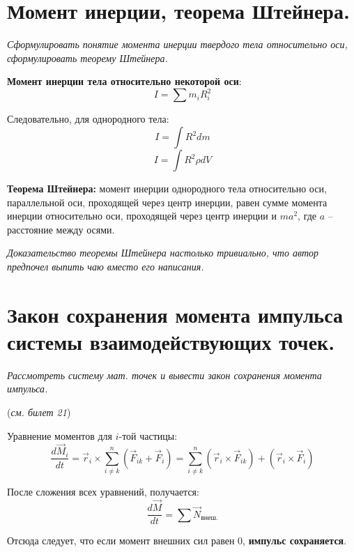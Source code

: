 \documentclass{article}
\begin{document}
    \section{Момент инерции, теорема Штейнера.}
    \par
      \textit{Сформулировать понятие момента инерции твердого тела относительно оси, сформулировать теорему Штейнера.}\\
    \par
      \textbf{Момент инерции тела относительно некоторой оси}:
      \begin{equation}
	I=\sum m_i R_i^2
      \end{equation}
    \par
      Следовательно, для однородного тела:
      \begin{equation}
	I=\int R^2dm
      \end{equation}
      \begin{equation}
	I=\int R^2\rho dV
      \end{equation}
    \par
      \textbf{Теорема Штейнера:} момент инерции однородного тела относительно оси, параллельной оси, проходящей через центр инерции, равен сумме момента инерции относительно оси, проходящей через центр инерции и $ma^2$, где $a$ -- расстояние между осями.\\
    \par
  
      \textit{Доказательство теоремы Штейнера настолько тривиально, что автор предпочел выпить чаю вместо его написания.}
  \clearpage
    
    \section{Закон сохранения момента импульса системы взаимодействующих точек.}
    \par
      \textit{Рассмотреть систему мат. точек и вывести закон сохранения момента импульса.}\\
    \par
      (\textit{см. билет 21})
    \par
      Уравнение моментов для $i$-той частицы:
      \begin{equation}
	\frac{d\vec M_i}{dt}=\vec r_i\times \sum_{i\neq k}^n(\vec F_{ik}+\vec F_i)=\sum_{i\neq k}^n (\vec r_i\times\vec F_{ik})+(\vec r_i\times\vec F_i)
      \end{equation}
    \par
      После сложения всех уравнений, получается:
      \begin{equation}
	\frac{d\vec M}{dt}=\sum \vec N_\text{внеш.}
      \end{equation}
    \par
      Отсюда следует, что если момент внешних сил равен 0, \textbf{импульс сохраняется}.
  \clearpage
    
\end{document}
